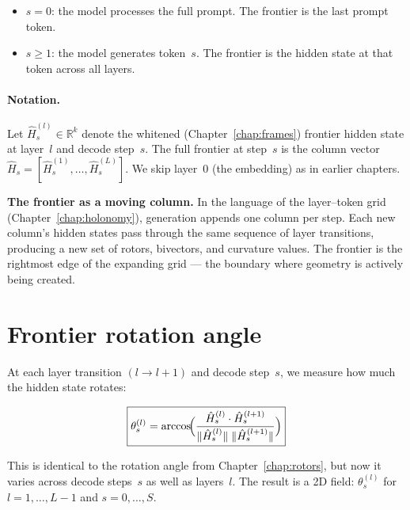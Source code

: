 \documentclass[11pt, twoside, openright]{memoir}
\numberwithin{equation}{chapter}
\begin{document}
\begin{itemize}[nosep]
\item $s = 0$: the model processes the full prompt.  The frontier
  is the last prompt token.
\item $s \geq 1$: the model generates token~$s$.  The frontier is
  the hidden state at that token across all layers.
\end{itemize}

\paragraph{Notation.}
Let $\hat{H}^{(l)}_s \in \mathbb{R}^k$ denote the whitened
(Chapter~\ref{chap:frames}) frontier hidden state at layer~$l$
and decode step~$s$.
The full frontier at step~$s$ is the column vector
$\hat{H}_s = [\hat{H}^{(1)}_s, \ldots, \hat{H}^{(L)}_s]$.
We skip layer~0 (the embedding) as in earlier chapters.

\begin{gabox}
\textbf{The frontier as a moving column.}
In the language of the layer--token grid (Chapter~\ref{chap:holonomy}),
generation appends one column per step.
Each new column's hidden states pass through the same sequence of
layer transitions, producing a new set of rotors, bivectors, and
curvature values.  The frontier is the rightmost edge of the
expanding grid --- the boundary where geometry is actively being
created.
\end{gabox}


\section{Frontier rotation angle}
\label{sec:frontier-angle}

At each layer transition $(l \to l+1)$ and decode step~$s$, we
measure how much the hidden state rotates:

\begin{equation}
  \boxed{%
    \theta^{(l)}_s
    = \arccos\!\Bigl(
        \frac{\hat{H}^{(l)}_s \cdot \hat{H}^{(l+1)}_s}
             {\|\hat{H}^{(l)}_s\|\;\|\hat{H}^{(l+1)}_s\|}
      \Bigr)
  }
\end{equation}

This is identical to the rotation angle from
Chapter~\ref{chap:rotors}, but now it varies across decode
steps~$s$ as well as layers~$l$.  The result is a 2D field:
$\theta^{(l)}_s$ for $l = 1, \ldots, L-1$ and $s = 0, \ldots, S$.
\end{document}
